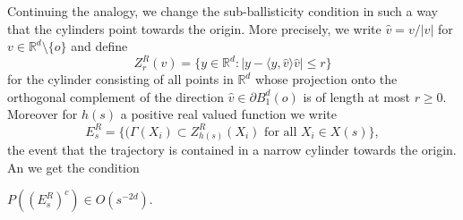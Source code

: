 Continuing the analogy, we change the sub-ballisticity condition in such a way that the cylinders point towards the origin. More precisely,  we write $\hat{v}=v/\vert v\vert$ for $v\in\mathbb{R}^d\setminus\lbrace o\rbrace $ and define $$Z_r^R(v)=\lbrace y\in\mathbb{R}^d:\vert y-\langle y,\hat{v}\rangle\hat{v}\vert\leq r\rbrace$$ for the cylinder consisting of all points in $\mathbb{R}^d$ whose projection onto the orthogonal complement of the direction $\hat{v}\in\partial B_1^d(o)$ is of length at most $r\geq 0$. Moreover for $h(s)$ a positive real valued function we write
 $$E^R_s=\lbrace({\Gamma}(X_i)\subset Z_{h(s)}^R(X_i)\mbox{ for all }X_i \in X{(s)}\rbrace, $$ the event that the trajectory is contained in a narrow cylinder towards the origin. An we get the condition 
 \begin{con}\label{con4} $P((E_s^R)^c)\in O(s^{-2d})$.
\end{con} 

